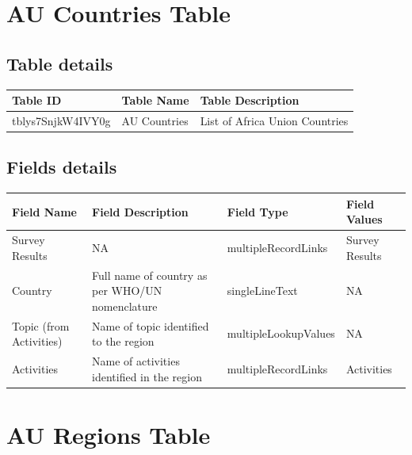 \documentclass[
]{book}
\begin{document}
\hypertarget{au-countries-table}{%
\section{AU Countries Table}\label{au-countries-table}}

\hypertarget{table-details-1}{%
\subsection{Table details}\label{table-details-1}}

\begin{table}
\centering
\begin{tabular}{l|l|l}
\hline
\textbf{Table ID} & \textbf{Table Name} & \textbf{Table Description}\\
\hline
tblys7SnjkW4IVY0g & AU Countries & List of Africa Union Countries\\
\hline
\end{tabular}
\end{table}

\hypertarget{fields-details-1}{%
\subsection{Fields details}\label{fields-details-1}}

\begin{table}
\centering
\begin{tabular}{l|l|l|l}
\hline
\textbf{Field Name} & \textbf{Field Description} & \textbf{Field Type} & \textbf{Field Values}\\
\hline
Survey Results & NA & multipleRecordLinks & Survey Results\\
\hline
Country & Full name of country as per WHO/UN nomenclature & singleLineText & NA\\
\hline
Topic (from Activities) & Name of topic identified to the region & multipleLookupValues & NA\\
\hline
Activities & Name of activities identified in the region & multipleRecordLinks & Activities\\
\hline
\end{tabular}
\end{table}

\hypertarget{au-regions-table}{%
\section{AU Regions Table}\label{au-regions-table}}
\end{document}
